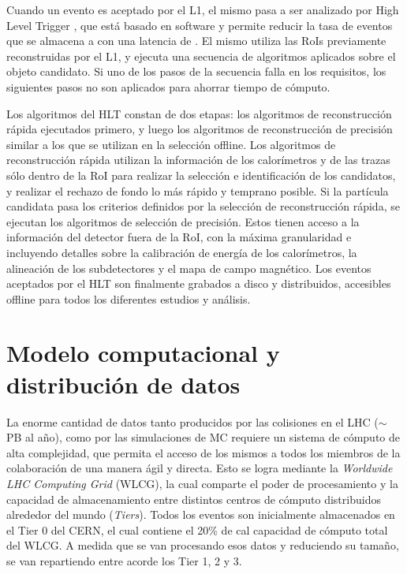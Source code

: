 Cuando un evento es aceptado por el L1, el mismo pasa a ser analizado por High Level Trigger \cite{ATLAS-TDR-16}, que está basado en software y permite reducir la tasa de eventos que se almacena a  con una latencia de . El mismo utiliza las RoIs previamente reconstruidas por el L1, y ejecuta una secuencia de algoritmos aplicados sobre el objeto candidato. Si uno de los pasos de la secuencia falla en los requisitos, los siguientes pasos no son aplicados para ahorrar tiempo de cómputo. 


Los algoritmos del HLT constan de dos etapas: los algoritmos de reconstrucción rápida ejecutados primero, y luego los algoritmos de reconstrucción de precisión similar a los que se utilizan en la selección offline. Los algoritmos de reconstrucción rápida utilizan la información de los calorímetros y de las trazas sólo dentro de la RoI para realizar la selección e identificación de los candidatos, y realizar el rechazo de fondo lo más rápido y temprano posible. Si la partícula candidata pasa los criterios definidos por la selección de reconstrucción rápida, se ejecutan los algoritmos de selección de precisión. Estos tienen acceso a la información del detector fuera de la RoI, con la máxima granularidad e incluyendo detalles sobre la calibración de energía de los calorímetros, la alineación de los subdetectores y el mapa de campo magnético. Los eventos aceptados por el HLT son finalmente grabados a disco y distribuidos, accesibles offline para todos los diferentes estudios y análisis.


\section{Modelo computacional y distribución de datos}\label{sec:lhc_samples}


La enorme cantidad de datos tanto producidos por las colisiones en el LHC ($\sim$\,PB al año), como por las simulaciones de MC requiere un sistema de cómputo de alta complejidad, que permita el acceso de los mismos a todos los miembros de la colaboración de una manera ágil y directa. Esto se logra mediante la \textit{Worldwide LHC Computing Grid} (WLCG), la cual comparte el poder de procesamiento y la capacidad de almacenamiento entre distintos centros de cómputo distribuidos alrededor del mundo (\textit{Tiers}). Todos los eventos son inicialmente almacenados en el Tier 0 del CERN, el cual contiene el 20\% de cal capacidad de cómputo total del WLCG. A medida que se van procesando esos datos y reduciendo su tamaño, se van repartiendo entre acorde los Tier 1, 2 y 3.

